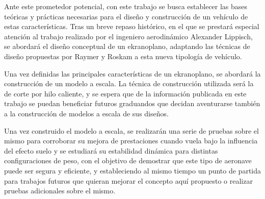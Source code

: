 
Ante este prometedor potencial, con este trabajo se busca establecer las bases teóricas y prácticas necesarias para el diseño y construcción de un vehículo de estas características.  Tras un breve repaso histórico, en el que se prestará especial atención al trabajo realizado por el ingeniero aerodinámico Alexander Lippisch, se abordará el diseño conceptual de un ekranoplano, adaptando las técnicas de diseño propuestas por Raymer\cite{ref:raymer}  y Roskam\cite{ref:roskam} a esta nueva tipología de vehículo.

Una vez definidas las principales características de un ekranoplano, se abordará la construcción de un modelo a escala. 
La técnica de construcción utilizada será la de corte por hilo caliente, y se espera que de la información publicada en este trabajo se puedan beneficiar futuros graduandos que decidan aventurarse también a la construcción de modelos a escala de sus diseños.

Una vez construido el modelo a escala, se realizarán una serie de pruebas sobre el mismo para corroborar su mejora de prestaciones cuando vuela bajo la influencia del efecto suelo y se estudiará su estabilidad dinámica para distintas configuraciones de peso, con el objetivo de demostrar que este tipo de aeronave puede ser segura y eficiente, y estableciendo al mismo tiempo un punto de partida para trabajos futuros que quieran mejorar el concepto aquí propuesto o realizar pruebas adicionales sobre el mismo.
